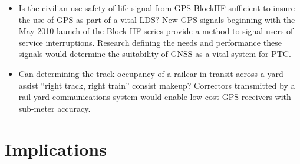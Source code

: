 \begin{itemize}
\item
Is the civilian-use safety-of-life signal from GPS BlockIIF sufficient to insure the use of GPS as part of a vital LDS? New GPS signals beginning with the May 2010 launch of the Block IIF series provide a method to signal users of service interruptions. Research defining the needs and performance these signals would determine the suitability of GNSS as a vital system for PTC.

\item
Can determining the track occupancy of a railcar in transit across a yard assist ``right track, right train'' consist makeup? Correctors transmitted by a rail yard communications system would enable low-cost GPS receivers with sub-meter accuracy.
	
\end{itemize}

\section{Implications}

